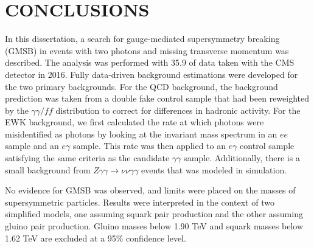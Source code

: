 \chapter{CONCLUSIONS}
\label{chap:Conclusions}

In this dissertation, a search for gauge-mediated supersymmetry breaking (GMSB) in events with two photons and missing transverse momentum was described. The analysis was performed with 35.9 \fbinv of data taken with the CMS detector in 2016. Fully data-driven background estimations were developed for the two primary backgrounds. For the QCD background, the background prediction was taken from a double fake control sample that had been reweighted by the $\gamma\gamma/ff$ \diempt distribution to correct for differences in hadronic activity. For the EWK background, we first calculated the rate at which photons were misidentified as photons by looking at the invariant mass spectrum in an $ee$ sample and an $e\gamma$ sample. This rate was then applied to an $e\gamma$ control sample satisfying the same criteria as the candidate $\gamma\gamma$ sample. Additionally, there is a small background from $Z\gamma\gamma\rightarrow\nu\nu\gamma\gamma$ events that was modeled in simulation. 

No evidence for GMSB was observed, and limits were placed on the masses of supersymmetric particles. Results were interpreted in the context of two simplified models, one assuming squark pair production and the other assuming gluino pair production. Gluino masses below 1.90 TeV and squark masses below 1.62 TeV are excluded at a 95\% confidence level.